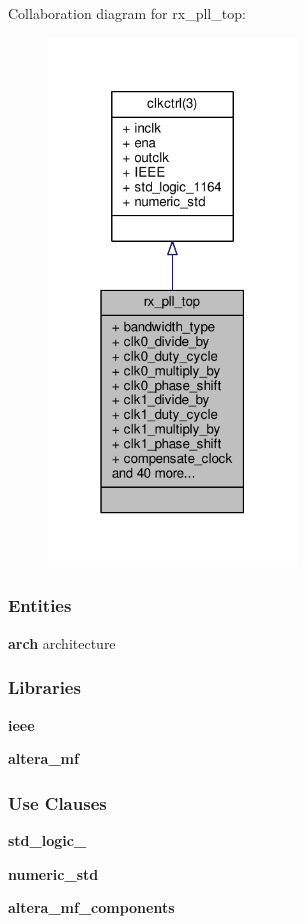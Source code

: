 Collaboration diagram for rx\+\_\+pll\+\_\+top\+:\nopagebreak
\begin{figure}[H]
\begin{center}
\leavevmode
\includegraphics[width=187pt]{dc/d76/classrx__pll__top__coll__graph}
\end{center}
\end{figure}
\subsubsection*{Entities}
\begin{DoxyCompactItemize}
\item 
{\bf arch} architecture
\end{DoxyCompactItemize}
\subsubsection*{Libraries}
 \begin{DoxyCompactItemize}
\item 
{\bf ieee} 
\item 
{\bf altera\+\_\+mf} 
\end{DoxyCompactItemize}
\subsubsection*{Use Clauses}
 \begin{DoxyCompactItemize}
\item 
{\bf std\+\_\+logic\+\_}   
\item 
{\bf numeric\+\_\+std}   
\item 
{\bf altera\+\_\+mf\+\_\+components}   
\end{DoxyCompactItemize}

